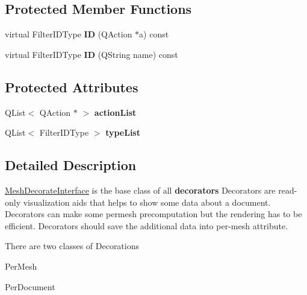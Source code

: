 \subsection*{Protected Member Functions}
\begin{DoxyCompactItemize}
\item 
\mbox{\label{class_mesh_decorate_interface_a2e860d47b48e42054301dc4fa0c55fc7}} 
virtual Filter\+I\+D\+Type {\bfseries ID} (Q\+Action $\ast$a) const
\item 
\mbox{\label{class_mesh_decorate_interface_a069cda13c806e5478144dc4730a38078}} 
virtual Filter\+I\+D\+Type {\bfseries ID} (Q\+String name) const
\end{DoxyCompactItemize}
\subsection*{Protected Attributes}
\begin{DoxyCompactItemize}
\item 
\mbox{\label{class_mesh_decorate_interface_a20580bb7e085b95ed7f37f04154c4287}} 
Q\+List$<$ Q\+Action $\ast$ $>$ {\bfseries action\+List}
\item 
\mbox{\label{class_mesh_decorate_interface_a8d014a60483b64eb8b7c47ffc8e63368}} 
Q\+List$<$ Filter\+I\+D\+Type $>$ {\bfseries type\+List}
\end{DoxyCompactItemize}


\subsection{Detailed Description}
\hyperlink{class_mesh_decorate_interface}{Mesh\+Decorate\+Interface} is the base class of all {\bfseries  decorators } Decorators are \textquotesingle{}read-\/only\textquotesingle{} visualization aids that helps to show some data about a document. Decorators can make some permesh precomputation but the rendering has to be efficient. Decorators should save the additional data into per-\/mesh attribute.

There are two classes of Decorations
\begin{DoxyItemize}
\item Per\+Mesh
\item Per\+Document
\end{DoxyItemize}

